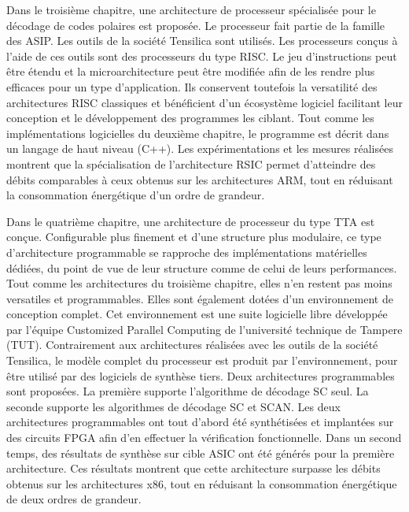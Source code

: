 Dans le troisième chapitre, une architecture de processeur spécialisée pour le décodage de codes polaires est proposée. Le processeur fait partie de la famille des ASIP. Les outils de la société Tensilica sont utilisés. Les processeurs conçus à l'aide de ces outils sont des processeurs du type RISC. Le jeu d'instructions peut être étendu et la microarchitecture peut être modifiée afin de les rendre plus efficaces pour un type d'application. Ils conservent toutefois la versatilité des architectures RISC classiques et bénéficient d'un écosystème logiciel facilitant leur conception et le développement des programmes les ciblant. Tout comme les implémentations logicielles du deuxième chapitre, le programme est décrit dans un langage de haut niveau (C++). Les expérimentations et les mesures réalisées montrent que la spécialisation de l'architecture RSIC permet d'atteindre des débits comparables à ceux obtenus sur les architectures ARM, tout en réduisant la consommation énergétique d'un ordre de grandeur.

Dans le quatrième chapitre, une architecture de processeur du type TTA est conçue. Configurable plus finement et d'une structure plus modulaire, ce type d'architecture programmable se rapproche des implémentations matérielles dédiées, du point de vue de leur structure comme de celui de leurs performances. Tout comme les architectures du troisième chapitre, elles n'en restent pas moins versatiles et programmables. Elles sont également dotées d'un environnement de conception complet. Cet environnement est une suite logicielle libre développée par l'équipe \og Customized Parallel Computing \fg de l'université technique de Tampere (TUT). Contrairement aux architectures réalisées avec les outils de la société Tensilica, le modèle complet du processeur est produit par l'environnement, pour être utilisé par des logiciels de synthèse tiers. Deux architectures programmables sont proposées. La première supporte l'algorithme de décodage SC seul. La seconde supporte les algorithmes de décodage SC et SCAN. Les deux architectures programmables ont tout d'abord été synthétisées et implantées sur des circuits FPGA afin d'en effectuer la vérification fonctionnelle. Dans un second temps, des résultats de synthèse sur cible ASIC ont été générés pour la première architecture. Ces résultats montrent que cette architecture surpasse les débits obtenus sur les architectures x86, tout en réduisant la consommation énergétique de deux ordres de grandeur.

